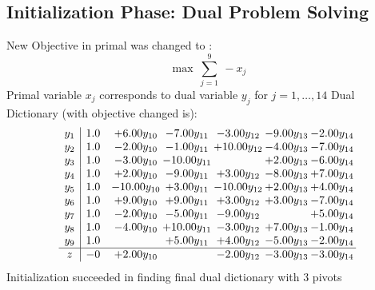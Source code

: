 \documentclass[9pt]{article}
\begin{document}
\subsection{Initialization Phase: Dual Problem Solving}
New Objective in primal was changed to : \[ \max\ \sum_{j=1}^{9}\ - x_j \] 
Primal variable $x_j$ corresponds to dual variable $y_j$ for $j = 1,\ldots,14$
Dual Dictionary (with objective changed is): 
\[\begin{array}{c| c c@{\hskip 2pt} c@{\hskip 2pt} c@{\hskip 2pt} c@{\hskip 2pt} c@{\hskip 2pt} }
 y_{1}   &  1.0 & +  6.00 y_{10} & -7.00 y_{11} & -3.00 y_{12} & -9.00 y_{13} & -2.00 y_{14}\\
 y_{2}   &  1.0 & -2.00 y_{10} & -1.00 y_{11} & + 10.00 y_{12} & -4.00 y_{13} & -7.00 y_{14}\\
 y_{3}   &  1.0 & -3.00 y_{10} & -10.00 y_{11} &   & +  2.00 y_{13} & -6.00 y_{14}\\
 y_{4}   &  1.0 & +  2.00 y_{10} & -9.00 y_{11} & +  3.00 y_{12} & -8.00 y_{13} & +  7.00 y_{14}\\
 y_{5}   &  1.0 & -10.00 y_{10} & +  3.00 y_{11} & -10.00 y_{12} & +  2.00 y_{13} & +  4.00 y_{14}\\
 y_{6}   &  1.0 & +  9.00 y_{10} & +  9.00 y_{11} & +  3.00 y_{12} & +  3.00 y_{13} & -7.00 y_{14}\\
 y_{7}   &  1.0 & -2.00 y_{10} & -5.00 y_{11} & -9.00 y_{12} &   & +  5.00 y_{14}\\
 y_{8}   &  1.0 & -4.00 y_{10} & + 10.00 y_{11} & -3.00 y_{12} & +  7.00 y_{13} & -1.00 y_{14}\\
 y_{9}   &  1.0  &   & +  5.00 y_{11} & +  4.00 y_{12} & -5.00 y_{13} & -2.00 y_{14}\\
\hline
z    &  -0 & +  2.00 y_{10} &   & -2.00 y_{12} & -3.00 y_{13} & -3.00 y_{14}\\
\end{array}\]
Initialization succeeded in finding final dual dictionary with 3 pivots
\end{document}
